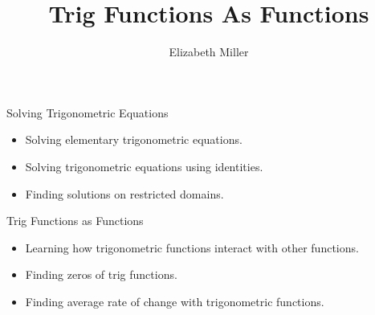 \documentclass{ximera}
\author{Elizabeth Miller}
\title{Trig Functions As Functions}
\begin{document}
\begin{abstract}
\end{abstract}
\maketitle


\begin{objectives}

	\item Solving Trigonometric Equations
		\begin{itemize}
			\item Solving elementary trigonometric equations.
			\item Solving trigonometric equations using identities.
			\item Finding solutions on restricted domains.
		\end{itemize}
	
	\item Trig Functions as Functions
		\begin{itemize}
			\item Learning how trigonometric functions interact with other functions.
			\item Finding zeros of trig functions. 
			\item Finding average rate of change with trigonometric functions.
		\end{itemize}



\end{objectives}
\end{document}
